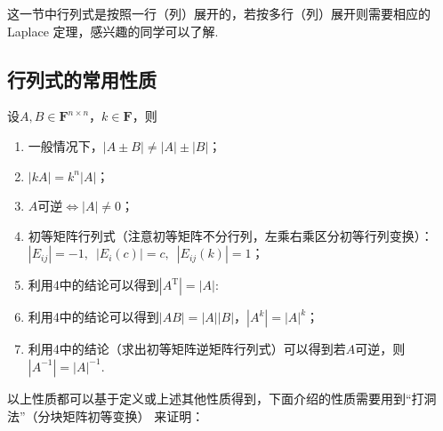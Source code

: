 这一节中行列式是按照一行（列）展开的，若按多行（列）展开则需要相应的 Laplace 定理，感兴趣的同学可以了解.
\subsection{行列式的常用性质}
设$A,B \in \mathbf{F}^{n \times n}$，$k \in \mathbf{F}$，则
\begin{enumerate}
    \item 一般情况下，$|A \pm B| \neq |A|\pm|B|$；

    \item $|kA|=k^n|A|$；

    \item $A$可逆$\iff |A| \neq 0$；

    \item 初等矩阵行列式（注意初等矩阵不分行列，左乘右乘区分初等行列变换）：$|E_{ij}|=-1,\enspace |E_i(c)|=c,\enspace |E_{ij}(k)|=1$；

    \item 利用4中的结论可以得到$|A^\mathrm{T}|=|A|$:

    \item 利用4中的结论可以得到$|AB|=|A||B|$，$|A^k|=|A|^k$；

    \item 利用4中的结论（求出初等矩阵逆矩阵行列式）可以得到若$A$可逆，则$|A^{-1}|=|A|^{-1}$.
\end{enumerate}

以上性质都可以基于定义或上述其他性质得到，下面介绍的性质需要用到``打洞法''（分块矩阵初等变换）
来证明：

